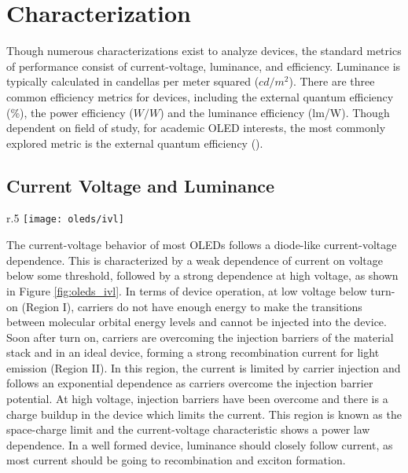 \documentclass[../thesis.tex]{subfiles}
\begin{document}
\section{Characterization}

Though numerous characterizations exist to analyze devices, the standard metrics of performance consist of current-voltage, luminance, and efficiency.
Luminance is typically calculated in candellas per meter squared ($cd/m^2$).
There are three common efficiency metrics for devices, including the external quantum efficiency (\%), the power efficiency ($W/W$) and the luminance efficiency (lm/W).
Though dependent on field of study, for academic OLED interests, the most commonly explored metric is the external quantum efficiency (\eqe).

\subsection{Current Voltage and Luminance}

\begin{wrapfigure}{r}{.5\textwidth}
    \centering
    \texttt{[image: oleds/ivl]}
    \caption{a. Device current voltage  and luminance voltage behavior}
    \label{fig:oleds_ivl}\par\vfill
\end{wrapfigure}

The current-voltage behavior of most OLEDs follows a diode-like current-voltage dependence.
This is characterized by a weak dependence of current on voltage below some threshold, followed by a strong dependence at high voltage, as shown in Figure \ref{fig:oleds_ivl}.
In terms of device operation, at low voltage below turn-on (Region I), carriers do not have enough energy to make the transitions between molecular orbital energy levels and cannot be injected into the device.
Soon after turn on, carriers are overcoming the injection barriers of the material stack and in an ideal device, forming a strong recombination current for light emission (Region II).
In this region, the current is limited by carrier injection and follows an exponential dependence as carriers overcome the injection barrier potential.\supercite{Pope1999}
At high voltage, injection barriers have been overcome and there is a charge buildup in the device which limits the current.
This region is known as the space-charge limit and the current-voltage characteristic shows a power law dependence.\supercite{Pope1999,Mark1962,Lampert2002a}
In a well formed device, luminance should closely follow current, as most current should be going to recombination and exciton formation.
\end{document}
